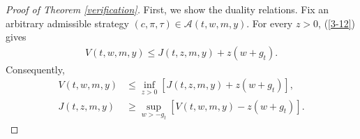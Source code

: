 \documentclass[a4paper,11pt]{amsart}
\numberwithin{equation}{section}
\newtheorem{lemma}{Lemma}[section]
\begin{document}
{%







\begin{proof}[Proof of Theorem \ref{verification}]
\color{black}
First, we show the duality relations. Fix an arbitrary admissible strategy $(c,\pi,\tau)\in\mathcal A(t,w,m,y)$. For every $z>0$, (\ref{3-12}) gives
\begin{align*}
V(t,w,m,y)\leq J(t,z,m,y)+z(w+g_t).
\end{align*}
Consequently,
\begin{align*}
V(t,w,m,y)&\leq\inf_{z>0}[J(t,z,m,y)+z(w+g_t)],\\
J(t,z,m,y)&\geq\sup_{w>-g_t}[V(t,w,m,y)-z(w+g_t)].
\end{align*}


\end{proof}}
\end{document}
